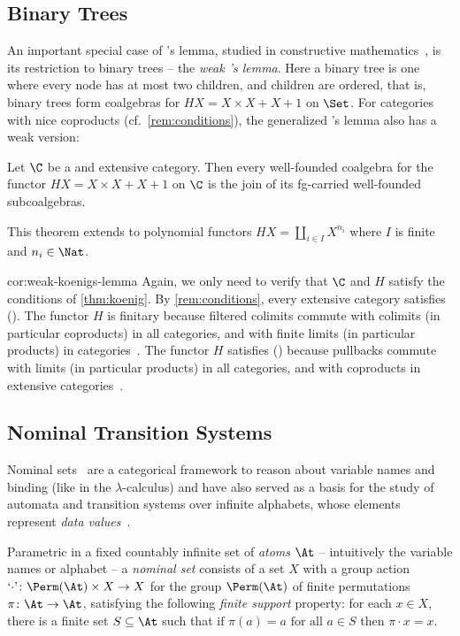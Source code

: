 \subsection{Binary Trees}
An important special case of \Konig's lemma, studied in constructive mathematics~\cite{di21}, is its restriction to binary trees -- the \emph{weak \Konig's lemma}. Here a {binary} tree is one where every node has at most two children, and children are ordered, that is, binary trees form coalgebras for $HX = X\times X + X + 1$ on $\Set$. For \lfp categories with nice coproducts (cf.~\autoref{rem:conditions}), the generalized \Konig's lemma also has a weak version:

\begin{theorem}\label{cor:weak-koenigs-lemma}
Let $\C$ be a \lfp and extensive category. Then every well-founded coalgebra for the functor $HX = X\times X + X + 1$ on $\C$ is the join of its fg-carried well-founded subcoalgebras.  
\end{theorem}
This theorem extends to polynomial functors $HX = \coprod_{i\in I} X^{n_i}$ where $I$ is finite and $n_i\in \Nat$.

\begin{proofappendix}{cor:weak-koenigs-lemma}
Again, we only need to verify that $\C$ and $H$ satisfy the conditions of \autoref{thm:koenig}. By \autoref{rem:conditions}, every extensive category satisfies (\injmono). The functor $H$ is finitary because filtered colimits commute with colimits (in particular coproducts) in all categories, and with finite limits (in particular products) in \lfp categories~\cite[Prop.~1.59]{adamek_rosicky_1994}. The functor $H$ satisfies (\hpresint) because pullbacks commute with limits (in particular products) in all categories, and with coproducts in extensive categories~\cite[Lem.~1.4]{ls05}.
\end{proofappendix}




\subsection{Nominal Transition Systems}
\label{sec:nom}
Nominal sets~\cite{pitts13} are a categorical framework to reason about variable names and
binding (like in the $\lambda$-calculus) and have also served as a basis for the 
study of automata and transition systems over infinite alphabets, whose elements represent \emph{data values}~\cite{BojanczykEA14}.

Parametric in a fixed countably infinite set of \emph{atoms} $\At$ -- intuitively the variable
names or alphabet -- a \emph{nominal set} consists of a set $X$ with
a group action $\textnormal{`\ensuremath{\cdot}'}\colon \Perm(\At)\times X\to X$
for the group $\Perm(\At)$ of finite permutations $\pi\colon \At\to \At$, satisfying the following
\emph{finite support} property: for each $x\in X$,
there is a finite set $S\subseteq \At$ such that
$
  \text{if }\pi(a) = a \text{ for all }a\in S
  \text{ then }\pi\cdot x = x.
$

